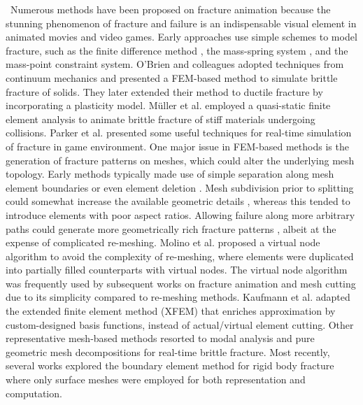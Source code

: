 ~Numerous methods have been proposed on fracture animation \cite{muguercia2014fracture,Wu:2015:SPB:2858852.2858866} because the stunning phenomenon of fracture and failure is an indispensable visual element in animated movies and video games. Early approaches use simple schemes to model fracture, such as the finite difference method \cite{Terzopoulos:1988:MID:378456.378522}, the mass-spring system \cite{Norton:1991:AFP:115244.115248}, and the mass-point constraint system\cite{smith2001fast}. O'Brien and colleagues \cite{O'Brien:1999:GMA:311535.311550} adopted techniques from continuum mechanics and presented a FEM-based method to simulate brittle fracture of solids. They later extended their method to ductile fracture by incorporating a plasticity model\cite{O'Brien:2002:GMA:566654.566579}. M\"{u}ller et al. \cite{Muller2001} employed a quasi-static finite element analysis to animate brittle fracture of stiff materials undergoing collisions. Parker et al. \cite{Parker:2009:RDF:1599470.1599492} presented some useful techniques for real-time simulation of fracture in game environment. One major issue in FEM-based methods is the generation of fracture patterns on meshes, which could alter the underlying mesh topology. Early methods typically made use of simple separation along mesh element boundaries \cite{Norton:1991:AFP:115244.115248,Mazarak:1999:AEO:351631.351688,smith2001fast,Muller2001} or even element deletion \cite{forest2002removing}. Mesh subdivision prior to splitting could somewhat increase the available geometric details \cite{Mor:2000:MST:646923.710372,Bielser:2000:ISS:826029.826523}, whereas this tended to introduce elements with poor aspect ratios. Allowing failure along more arbitrary paths could generate more geometrically rich fracture patterns \cite{Neff:1999:VMB:351631.351686,O'Brien:1999:GMA:311535.311550,O'Brien:2002:GMA:566654.566579}, albeit at the expense of complicated re-meshing. Molino et al. \cite{Molino2004} proposed a virtual node algorithm to avoid the complexity of re-meshing, where elements were duplicated into partially filled counterparts with virtual nodes. The virtual node algorithm was frequently used by subsequent works on fracture animation \cite{Bao:2007:FRM:1263129.1263275} and mesh cutting \cite{Sifakis:2007:ACD:1272690.1272701,Wang:2015:AVN:2849517.2849531} due to its simplicity compared to re-meshing methods. Kaufmann et al. \cite{Kaufmann:2009:ETD:1531326.1531356} adapted the extended finite element method (XFEM) that enriches approximation by custom-designed basis functions, instead of actual/virtual element cutting.
Other representative mesh-based methods resorted to modal analysis \cite{glondu2013real} and pure geometric mesh decompositions \cite{Muller:2013:RTD:2461912.2461934,Schvartzman:2014:FAB:2556700.2556713} for real-time brittle fracture. Most recently, several works explored the boundary element method for rigid body fracture \cite{Zhu:2015:SRB:2809654.2766942,Hahn:2015:HBF:2809654.2766896} where only surface meshes were employed for both representation and computation.

